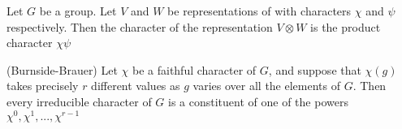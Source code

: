 \begin{proposition}
    Let $G$ be a group. Let $V$ and $W$ be representations of with characters $\chi$ and $\psi$ respectively. Then 
    the character of the representation $V \otimes W$ is the product character $\chi\psi$
\end{proposition}


\begin{theorem}\label{thm:Burnside_Brauer}(Burnside-Brauer)
    Let $\chi$ be a faithful character of $G$, and suppose that $\chi(g)$ takes precisely $r$ different values as 
    $g$ varies over all the elements of $G$. Then every irreducible character of $G$ is a constituent of one of the 
    powers $\chi^0, \chi^1, ... , \chi^{r-1}$
\end{theorem}





